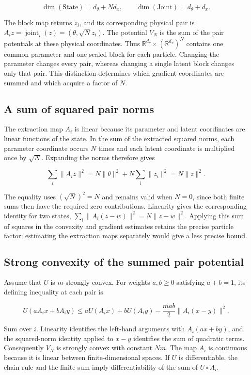 \documentclass[11pt,a4paper]{article}
\begin{document}
\[\dim(\mathrm{State})=d_\theta+Nd_x,\qquad \dim(\mathrm{Joint})=d_\theta+d_x.\]

The block map returns \(z_i\), and its corresponding physical pair is \(A_i z=\operatorname{joint}_i(z)=(\theta,\sqrt N z_i)\). The potential \(V_N\) is the sum of the pair potentials at these physical coordinates. Thus \(\mathbb R^{d_\theta}\times(\mathbb R^{d_x})^N\) contains one common parameter and one scaled block for each particle. Changing the parameter changes every pair, whereas changing a single latent block changes only that pair. This distinction determines which gradient coordinates are summed and which acquire a factor of \(N\).



\subsection{\texorpdfstring{A sum of squared pair norms}{A sum of squared pair norms}}


The extraction map \(A_i\) is linear because its parameter and latent coordinates are linear functions of the state. In the sum of the extracted squared norms, each parameter coordinate occurs \(N\) times and each latent coordinate is multiplied once by \(\sqrt N\). Expanding the norms therefore gives

\[\sum_i\|A_i z\|^2=N\|\theta\|^2+N\sum_i\|z_i\|^2=N\|z\|^2.\]

The equality uses \((\sqrt N)^2=N\) and remains valid when \(N=0\), since both finite sums then have the required zero contributions. Linearity gives the corresponding identity for two states, \(\sum_i\|A_i(z-w)\|^2=N\|z-w\|^2\). Applying this sum of squares in the convexity and gradient estimates retains the precise particle factor; estimating the extraction maps separately would give a less precise bound.



\subsection{\texorpdfstring{Strong convexity of the summed pair potential}{Strong convexity of the summed pair potential}}


Assume that \(U\) is \(m\)-strongly convex. For weights \(a,b\ge0\) satisfying \(a+b=1\), its defining inequality at each pair is

\[U(aA_ix+bA_iy)\le aU(A_ix)+bU(A_iy)-\frac{mab}{2}\|A_i(x-y)\|^2.\]

Sum over \(i\). Linearity identifies the left-hand arguments with \(A_i(ax+by)\), and the squared-norm identity applied to \(x-y\) identifies the sum of quadratic terms. Consequently \(V_N\) is strongly convex with constant \(Nm\). The map \(A_i\) is continuous because it is linear between finite-dimensional spaces. If \(U\) is differentiable, the chain rule and the finite sum imply differentiability of the sum of \(U\circ A_i\).
\end{document}
